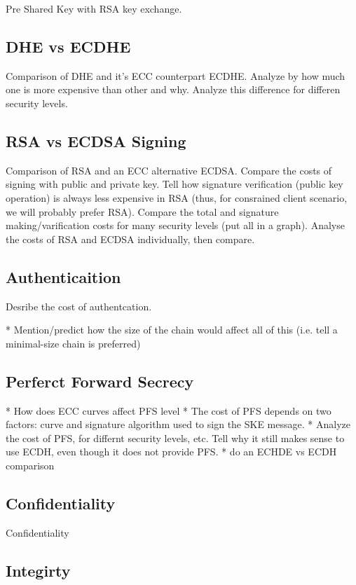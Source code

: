 \documentclass{llncs}
\begin{document}
Pre Shared Key with RSA key exchange.


\subsection{DHE vs ECDHE}

Comparison of DHE and it's ECC counterpart ECDHE. Analyze by how much one is more expensive than other and why.
Analyze this difference for differen security levels.

\subsection{RSA vs ECDSA Signing}

Comparison of RSA and an ECC alternative ECDSA. Compare the costs of signing with public and private key.
Tell how signature verification (public key operation) is always less expensive in RSA (thus, for consrained client
scenario, we will probably prefer RSA). Compare the total and signature making/varification costs for many security
levels (put all in a graph). Analyse the costs of RSA and ECDSA individually, then compare.

\subsection{Authenticaition}

Desribe the cost of authentcation.

* Mention/predict how the size of the chain would affect all of this (i.e. tell a minimal-size chain is
preferred)

\subsection{Perferct Forward Secrecy}

* How does ECC curves affect PFS level
* The cost of PFS depends on two factors: curve and signature algorithm used to sign the SKE message.
* Analyze the cost of PFS, for differnt security levels, etc. Tell why it still makes sense to use ECDH, even though
it does not provide PFS.
* do an ECHDE vs ECDH comparison


\subsection{Confidentiality}

Confidentiality

\subsection{Integirty}
\end{document}
